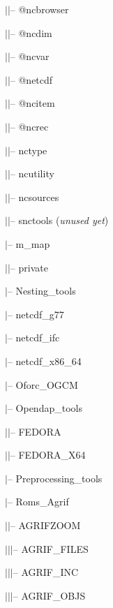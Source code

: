$|$\hspace{2.0cm}$|$-- @ncbrowser

$|$\hspace{2.0cm}$|$-- @ncdim

$|$\hspace{2.0cm}$|$-- @ncvar

$|$\hspace{2.0cm}$|$-- @netcdf

$|$\hspace{2.0cm}$|$-- @ncitem

$|$\hspace{2.0cm}$|$-- @ncrec

$|$\hspace{2.0cm}$|$-- nctype

$|$\hspace{2.0cm}$|$-- ncutility

$|$\hspace{2.0cm}$|$-- ncsources

$|$\hspace{0.5cm}$|$-- snctools (\textit{unused yet})

$|$-- m\_map

$|$\hspace{0.5cm}$|$-- private

$|$-- Nesting\_tools

$|$-- netcdf\_g77

$|$-- netcdf\_ifc

$|$-- netcdf\_x86\_64

$|$-- Oforc\_OGCM

$|$-- Opendap\_tools

$|$\hspace{0.5cm}$|$-- FEDORA

$|$\hspace{0.5cm}$|$-- FEDORA\_X64

$|$-- Preprocessing\_tools

$|$-- Roms\_Agrif

$|$\hspace{0.5cm}$|$-- AGRIFZOOM

$|$\hspace{0.5cm}$|$\hspace{0.5cm}$|$-- AGRIF\_FILES

$|$\hspace{0.5cm}$|$\hspace{0.5cm}$|$-- AGRIF\_INC

$|$\hspace{0.5cm}$|$\hspace{0.5cm}$|$-- AGRIF\_OBJS

